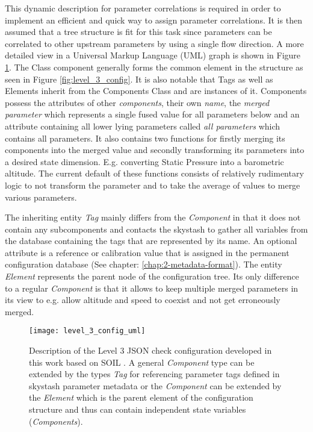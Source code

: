 This dynamic description for parameter correlations is required in order to implement an efficient and quick way to assign parameter correlations. It is then assumed that a tree structure is fit for this task since parameters can be correlated to other upstream parameters by using a single flow direction. A more detailed view in a Universal Markup Language (UML) graph is shown in Figure \ref{fig:level_3_config_uml}. The Class component generally forms the common element in the structure as seen in Figure \ref{fig:level_3_config}. It is also notable that Tags as well as Elements inherit from the Components Class and are instances of it. Components possess the attributes of other \textit{components}, their own \textit{name}, the \textit{merged parameter} which represents a single fused value for all parameters below and an attribute containing all lower lying parameters called \textit{all parameters} which contains all parameters. It also contains two functions for firstly merging its components into the merged value and secondly transforming its parameters into a desired state dimension. E.g. converting Static Pressure into a barometric altitude. The current default of these functions consists of relatively rudimentary logic to not transform the parameter and to take the average of values to merge various parameters.

The inheriting entity \textit{Tag} mainly differs from the \textit{Component} in that it does not contain any subcomponents and contacts the skystash to gather all variables from the database containing the tags that are represented by its name. An optional attribute is a reference or calibration value that is assigned in the permanent configuration database (See chapter: \ref{chap:2-metadata-format}).
The entity \textit{Element} represents the parent node of the configuration tree. Its only difference to a regular \textit{Component} is that it allows to keep multiple merged parameters in its view to e.g. allow altitude and speed to coexist and not get erroneously merged.

\begin{figure}
    \centering
    \texttt{[image: level\_3\_config\_uml]}
    \caption[Level 3 Parity UML configuration description]{Description of the Level 3 JSON check configuration developed in this work based on SOIL \cite{behrens_domain-specific_2021}. A general \textit{Component} type can be extended by the types \textit{Tag} for referencing parameter tags defined in skystash parameter metadata or the \textit{Component} can be extended by the \textit{Element} which is the parent element of the configuration structure and thus can contain independent state variables (\textit{Components}).}
    \label{fig:level_3_config_uml}
\end{figure}


